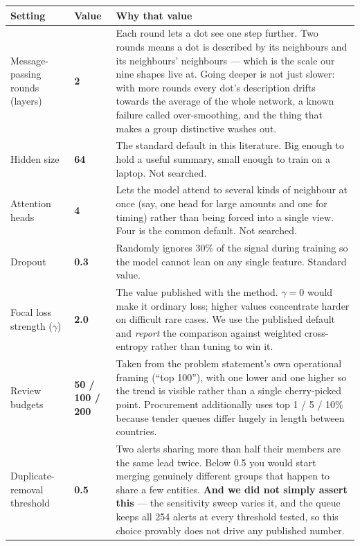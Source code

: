\documentclass[11pt,a4paper]{article}
\begin{document}
\begin{longtable}{@{}p{3.5cm}p{1.6cm}p{9.9cm}@{}}
\toprule
\textbf{Setting} & \textbf{Value} & \textbf{Why that value} \\
\midrule
\endhead
Message-passing rounds (layers) & \textbf{2} &
Each round lets a dot see one step further. Two rounds means a dot is described
by its neighbours and its neighbours' neighbours --- which is the scale our nine
shapes live at. Going deeper is not just slower: with more rounds every dot's
description drifts towards the average of the whole network, a known failure
called over-smoothing, and the thing that makes a group distinctive washes out. \\
\addlinespace
Hidden size & \textbf{64} &
The standard default in this literature. Big enough to hold a useful summary,
small enough to train on a laptop. Not searched. \\
\addlinespace
Attention heads & \textbf{4} &
Lets the model attend to several kinds of neighbour at once (say, one head for
large amounts and one for timing) rather than being forced into a single view.
Four is the common default. Not searched. \\
\addlinespace
Dropout & \textbf{0.3} &
Randomly ignores 30\% of the signal during training so the model cannot lean on
any single feature. Standard value. \\
\addlinespace
Focal loss strength ($\gamma$) & \textbf{2.0} &
The value published with the method. $\gamma=0$ would make it ordinary loss;
higher values concentrate harder on difficult rare cases. We use the published
default and \emph{report} the comparison against weighted cross-entropy rather
than tuning to win it. \\
\addlinespace
Review budgets & \textbf{50 / 100 / 200} &
Taken from the problem statement's own operational framing (``top 100''), with
one lower and one higher so the trend is visible rather than a single
cherry-picked point. Procurement additionally uses top 1 / 5 / 10\% because
tender queues differ hugely in length between countries. \\
\addlinespace
Duplicate-removal threshold & \textbf{0.5} &
Two alerts sharing more than half their members are the same lead twice. Below
0.5 you would start merging genuinely different groups that happen to share a
few entities. \textbf{And we did not simply assert this} --- the sensitivity
sweep varies it, and the queue keeps all 254 alerts at every threshold tested,
so this choice provably does not drive any published number. \\

\end{longtable}
\end{document}
